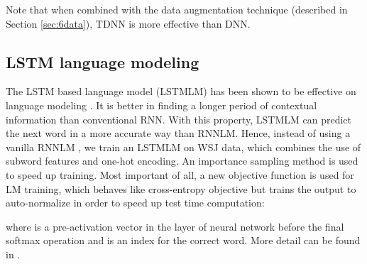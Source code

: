\documentclass[a4paper]{article}
\begin{document}
Note that when combined with the data augmentation technique (described in Section \ref{sec:6data}), TDNN is more effective than DNN.

\subsection{LSTM language modeling}
\label{sec:lstm}
The LSTM based language model (LSTMLM) has been shown to be effective on language modeling \cite{sundermeyer2012lstm}. It is better in finding a longer period of contextual information than conventional RNN. With this property, LSTMLM can predict the next word in a more accurate way than RNNLM. Hence, instead of using a vanilla RNNLM \cite{mikolov2010recurrent}, we train an LSTMLM on WSJ data, which combines the use of subword features and one-hot encoding. An importance sampling method is used to speed up training.
Most important of all, a new objective function  is used for LM training, 
which behaves like cross-entropy objective but trains
the output to auto-normalize in order to speed up test time
computation:

where  is a pre-activation vector in the layer of neural network before the final softmax operation and  is an index for the correct word.
More detail can be found in \cite{xuneural}.
\end{document}
